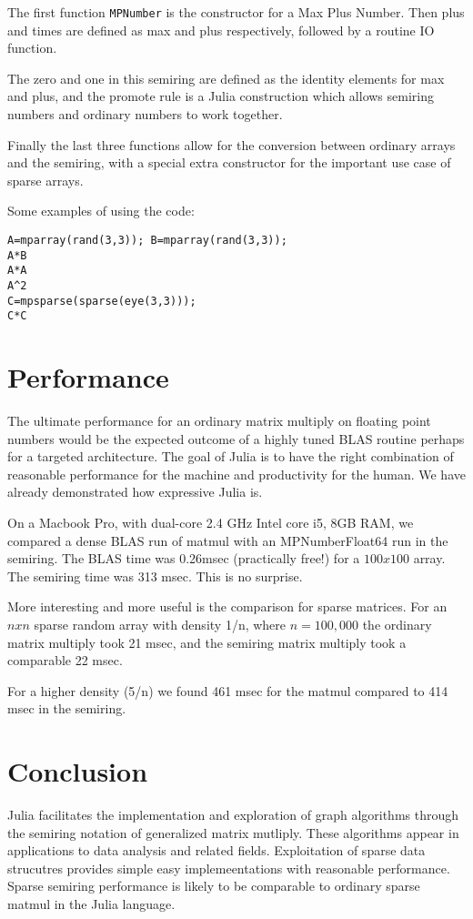 \documentclass[conference]{IEEEtran}
\begin{document}
The first function \verb+MPNumber+ is the constructor for a Max Plus Number.
Then plus and times are defined as max and plus respectively, followed by 
a routine IO function.

The zero and one in this semiring are defined as the identity elements for max and plus,
and the promote rule is a Julia construction which allows semiring numbers and ordinary
numbers to work together.

Finally the last three functions allow for the conversion between ordinary arrays and the semiring, with a special extra constructor for the important use case of sparse arrays.

Some examples of using the code:


\begin{verbatim}
A=mparray(rand(3,3)); B=mparray(rand(3,3));
A*B
A*A
A^2
C=mpsparse(sparse(eye(3,3)));
C*C
\end{verbatim}





\section{Performance}

The ultimate performance for an ordinary matrix multiply on floating point numbers 
would be the expected outcome of a highly tuned BLAS routine perhaps for a targeted
architecture.  The goal of Julia is to have the right combination of reasonable performance
for the machine and productivity for the human.  We have already demonstrated how expressive
Julia is.

On a Macbook Pro, with dual-core 2.4 GHz Intel core i5, 8GB RAM, we compared a dense BLAS run of matmul with an MPNumber{Float64} run in the semiring.
The BLAS time was 0.26msec (practically free!) for a $100x100$ array.  The semiring time
was 313 msec.  This is no surprise.

More interesting and more useful is the comparison for sparse matrices.  For an $n x n$ sparse random array with density 1/n, where $n = 100,000$ the ordinary matrix multiply took 21 msec, and the semiring matrix multiply took a comparable 22 msec.

For a higher density (5/n) we found 461 msec for the matmul compared to 414 msec in the semiring.




\section{Conclusion}

Julia facilitates the implementation and exploration of graph algorithms through
the semiring notation of generalized matrix mutliply.  These algorithms appear
in applications to data analysis and related fields.  Exploitation of sparse data 
strucutres provides simple easy implemeentations with reasonable performance.
Sparse semiring performance is likely to be comparable to ordinary sparse matmul in the Julia
language.




\end{document}
